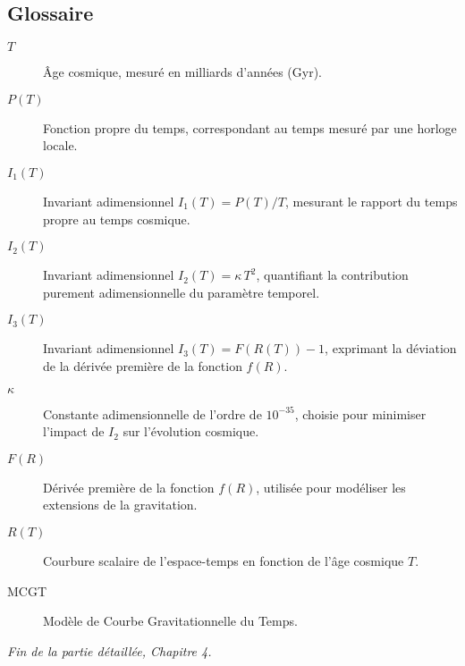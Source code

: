\subsection*{Glossaire}

\begin{description}
  \item[$T$] Âge cosmique, mesuré en milliards d’années (Gyr).
  \item[$P(T)$] Fonction propre du temps, correspondant au temps mesuré par une horloge locale.
  \item[$I_{1}(T)$] Invariant adimensionnel $I_{1}(T)=P(T)/T$, mesurant le rapport du temps propre au temps cosmique.
  \item[$I_{2}(T)$] Invariant adimensionnel $I_{2}(T)=\kappa\,T^{2}$, quantifiant la contribution purement adimensionnelle du paramètre temporel.
  \item[$I_{3}(T)$] Invariant adimensionnel $I_{3}(T)=F(R(T))-1$, exprimant la déviation de la dérivée première de la fonction $f(R)$.
  \item[$\kappa$] Constante adimensionnelle de l’ordre de $10^{-35}$, choisie pour minimiser l’impact de $I_{2}$ sur l’évolution cosmique.
  \item[$F(R)$] Dérivée première de la fonction $f(R)$, utilisée pour modéliser les extensions de la gravitation.
  \item[$R(T)$] Courbure scalaire de l’espace-temps en fonction de l’âge cosmique $T$.
  \item[MCGT] Modèle de Courbe Gravitationnelle du Temps.
\end{description}

\bigskip
\noindent\emph{Fin de la partie détaillée, Chapitre 4.}
